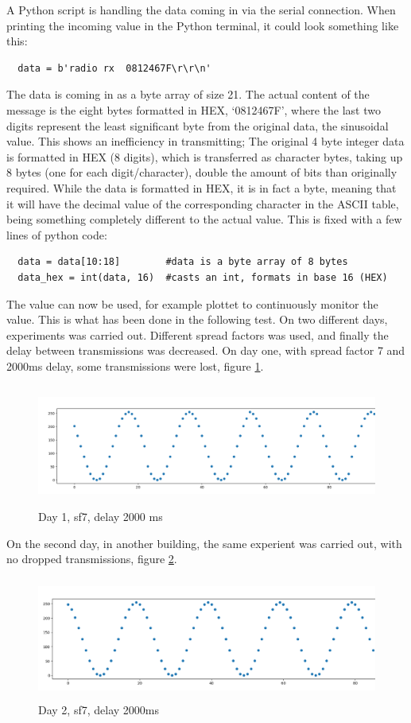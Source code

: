 A Python script is handling the data coming in via the serial connection. When printing the incoming value in the Python terminal, it could look something like this:
\begin{lstlisting}
  data = b'radio rx  0812467F\r\r\n'
\end{lstlisting}
The data is coming in as a byte array of size 21. The actual content of the message is the eight bytes formatted in HEX, `0812467F', where the last two digits represent the least significant byte from the original data, the sinusoidal value. This shows an inefficiency in transmitting; The original 4 byte integer data is formatted in HEX (8 digits), which is transferred as character bytes, taking up 8 bytes (one for each digit/character), double the amount of bits than originally required. While the data is formatted in HEX, it is in fact a byte, meaning that it will have the decimal value of the corresponding character in the ASCII table, being something completely different to the actual value. This is fixed with a few lines of python code:
\begin{lstlisting}
  data = data[10:18]        #data is a byte array of 8 bytes
  data_hex = int(data, 16)  #casts an int, formats in base 16 (HEX)
\end{lstlisting}
The value can now be used, for example plottet to continuously monitor the value. This is what has been done in the following test. On two different days, experiments was carried out. Different spread factors was used, and finally the delay between transmissions was decreased. On day one, with spread factor 7 and 2000ms delay, some transmissions were lost, figure \ref{fig:sf7-2000ms}.

\begin{figure}[h!]
  \centering
  \includegraphics[height = 4cm]{sf7.png}
  \caption{Day 1, sf7, delay 2000 ms}
  \label{fig:sf7-2000ms}
\end{figure}

On the second day, in another building, the same experient was carried out, with no dropped transmissions, figure \ref{fig:sf7-2}.
\begin{figure}[h!]
  \centering
  \includegraphics[height = 4cm]{sf7-2.png}
  \caption{Day 2, sf7, delay 2000ms}
  \label{fig:sf7-2}
\end{figure}

